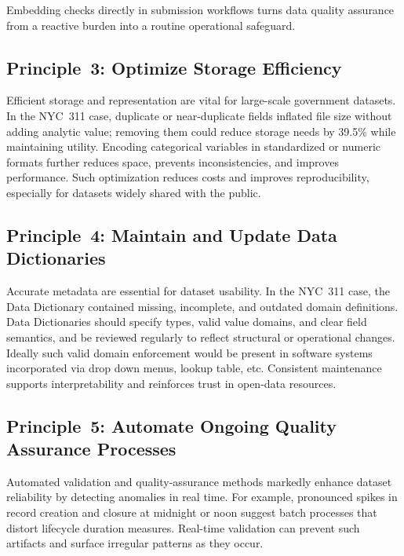 \documentclass[linenumber]{jdsart}
\begin{document}
Embedding checks directly in submission workflows turns data quality assurance
from a reactive burden into a routine operational safeguard.

\subsection{Principle~3: Optimize Storage Efficiency}
\label{subsec:principle3}

Efficient storage and representation are vital for large-scale government
datasets. In the NYC~311 case, duplicate or near-duplicate fields inflated file
size without adding analytic value; removing them could reduce storage needs by
39.5\% while maintaining utility. Encoding categorical variables in
standardized or numeric formats further reduces space, prevents
inconsistencies, and improves performance. Such optimization reduces costs and
improves reproducibility, especially for datasets widely shared with the
public.

\subsection{Principle~4: Maintain and Update Data Dictionaries}
\label{subsec:principle4}

Accurate metadata are essential for dataset usability. In the NYC~311 case, the
Data Dictionary contained missing, incomplete, and outdated domain definitions.
Data Dictionaries should specify types, valid value domains, and clear field
semantics, and be reviewed regularly to reflect structural or operational
changes. Ideally such valid domain enforcement would be present in
software systems incorporated via drop down menus, lookup table, etc.
Consistent maintenance supports interpretability and reinforces trust
in open-data resources.

\subsection{Principle~5: Automate Ongoing Quality Assurance Processes}
\label{subsec:principle5}

Automated validation and quality-assurance methods markedly enhance dataset
reliability by detecting anomalies in real time. For example, pronounced spikes
in record creation and closure at midnight or noon suggest batch processes that
distort lifecycle duration measures. Real-time validation can prevent such
artifacts and surface irregular patterns as they occur.
\end{document}
